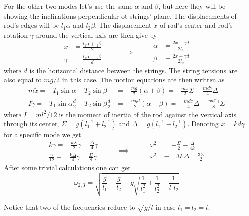 For the other two modes let's use the same $\alpha$ and $\beta$,
but here they will be showing the inclinations perpendicular ot strings' plane.
The displacements of rod's edges will be $l_1 \alpha$ and $l_2 \beta$.
The displacement $x$ of rod's center
and rod's rotation $\gamma$ around the vertical axis are then give by
\begin{equation}
\begin{split}
    x &= \frac{l_1 \alpha + l_2 \beta}{2} \\
    \gamma &= \frac{l_1 \alpha - l_2 \beta}{d}
\end{split}
\hspace{1cm} \implies \hspace{1cm}
\begin{split}
    \alpha &= \frac{2 x + \gamma d}{2 l_1} \\
    \beta &= \frac{2 x - \gamma d}{2 l_2}
\end{split}
\end{equation}
where $d$ is the horizontal distance between the strings.
The string tensions are also equal to $mg / 2$ in this case.
The motion equations are then written as
\begin{equation}
\begin{split}
    m \ddot{x} = -T_1 \sin{\alpha} - T_2 \sin{\beta} &=
    -\frac{mg}{2} (\alpha + \beta) =
    -\frac{mx}{2} \Sigma - \frac{md\gamma}{4} \Delta \\
    I \ddot{\gamma} = -T_1 \sin{\alpha} \frac{d}{2} + T_2 \sin{\beta} \frac{d}{2} &=
    -\frac{mgd}{2} (\alpha - \beta) = 
    -\frac{mdx}{4} \Delta - \frac{md^2\gamma}{8} \Sigma
\end{split}
\end{equation}
where $I = ml^2 / 12$ is the moment of inertia of the rod
against the vertical axis through its center,
$\Sigma = g (l_1^{-1} + l_2^{-1})$ and $\Delta = g(l_1^{-1} - l_2^{-1})$.
Denoting $x = k d\gamma$ for a specific mode we get
\begin{equation}
\begin{split}
    k\ddot{\gamma} = -\frac{k \Sigma}{2} \gamma - \frac{\Delta}{4} \gamma\\
    \frac{\ddot{\gamma}}{12} = -\frac{k \Delta}{4} \gamma - \frac{\Sigma}{8} \gamma
\end{split}
\hspace{1cm} \implies \hspace{1cm}
\begin{split}
    \omega^2 &= -\frac{\Sigma}{2} - \frac{\Delta}{4k}\\
    \omega^2 &= -3 k \Delta - \frac{3 \Sigma}{2}
\end{split}
\end{equation}
After some trivial calculations one can get
\begin{equation}
    \omega_{2, 3} = \sqrt{\frac{g}{l_1} + \frac{g}{l_2}
    \pm g \sqrt{\frac{1}{l_1^2} + \frac{1}{l_2^2} - \frac{1}{l_1 l_2}}}
\end{equation}

Notice that two of the frequencies reduce to $\sqrt{g/l}$ in case $l_1 = l_2 = l$.
